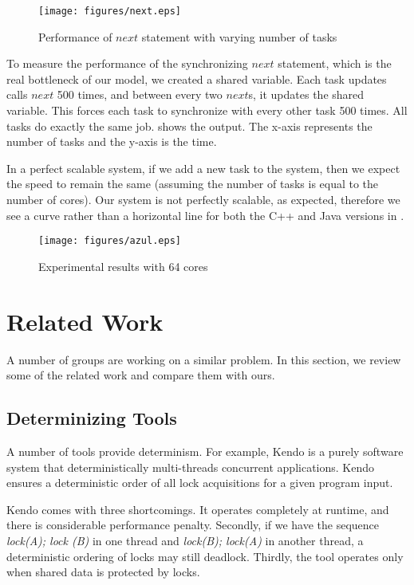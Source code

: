 \documentclass[10pt, conference, compsocconf]{IEEEtran}
\begin{document}
\begin{figure}[htbp]
\texttt{[image: figures/next.eps]}
\caption{Performance of $next$ statement with varying number of tasks}
\label{fig:next}
\end{figure}


To measure the performance of the synchronizing $next$ statement, which
is the real bottleneck of our model, we created a shared variable.
Each task updates calls $next$ 500 times, and between every two $next$s, it
updates the shared variable. This  forces
each task to synchronize with every other task 500 times.
All tasks do exactly the same job.  shows the output.
The x-axis represents the number of tasks and the y-axis is the time.

In a perfect scalable system, if we add a new task to the system, then we 
expect the  speed to remain the same (assuming the number of tasks is  
 equal to the number of cores). Our system is not perfectly scalable,
as expected, therefore we see a curve rather than a horizontal line for both
the C++ and Java versions in .



\begin{figure*}[htbp]
\texttt{[image: figures/azul.eps]}
\caption{Experimental results with 64 cores }
\label{fig:azul}
\end{figure*}



\section{Related Work}
\label{sec:related}

A number of groups are working on a similar problem.
In this section, we review some of the related work
and compare them with ours.
 
\subsection{Determinizing Tools} 

A number of tools provide determinism. For example, Kendo is a purely
software system that deterministically multi-threads concurrent 
applications.  Kendo~\cite{olszewski2009kendo} ensures a deterministic
order of all lock acquisitions for a given program input.

Kendo comes with three shortcomings. It operates completely at runtime,
and there is considerable performance penalty. Secondly, if
we have the sequence \emph{lock(A); lock (B)} in one thread and
\emph{lock(B); lock(A)} in another thread, a deterministic ordering of
locks may still deadlock. Thirdly, the tool operates only when
shared data is protected by locks.
\end{document}

